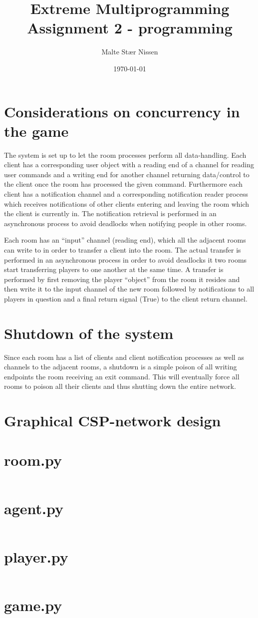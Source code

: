 \documentclass[11pt,a4paper]{article}
\title{Extreme Multiprogramming\\Assignment 2 - programming}
\author{Malte Stær Nissen}
\begin{document}
\date{\today}

\maketitle
\section{Considerations on concurrency in the game}
The system is set up to let the room processes perform all data-handling.
Each client has a corresponding user object with a reading end of a channel
for reading user commands and a writing end for another channel returning
data/control to the client once the room has processed the given command.
Furthermore each client has a notification channel and a corresponding
notification reader process which receives notifications of other clients
entering and leaving the room which the client is currently in. The
notification retrieval is performed in an asynchronous process to avoid
deadlocks when notifying people in other rooms.

Each room has an ``input'' channel (reading end), which all the adjacent
rooms can write to in order to transfer a client into the room. The actual
transfer is performed in an asynchronous process in order to avoid deadlocks
it two rooms start transferring players to one another at the same time. A
transfer is performed by first removing the player ``object'' from the room
it resides and then write it to the input channel of the new room followed by
notifications to all players in question and a final return signal (True) to
the client return channel.

\section{Shutdown of the system}
Since each room has a list of clients and client notification processes as
well as channels to the adjacent rooms, a shutdown is a simple poison of all
writing endpoints the room receiving an exit command. This will eventually
force all rooms to poison all their clients and thus shutting down the entire
network.

\section{Graphical CSP-network design}

\clearpage
\appendix

\section{room.py}
\inputminted[linenos,fontsize=\scriptsize]{python}{src/room.py}

\section{agent.py}
\inputminted[linenos,fontsize=\scriptsize]{python}{src/agent.py}

\section{player.py}
\inputminted[linenos,fontsize=\scriptsize]{python}{src/player.py}

\section{game.py}
\inputminted[linenos,fontsize=\scriptsize]{python}{src/game.py}
\end{document}
